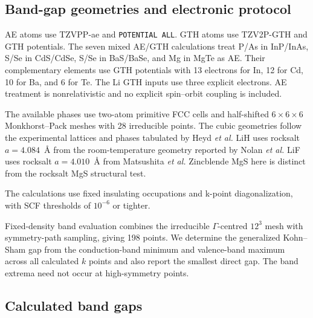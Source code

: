 \documentclass[10pt,a4paper]{article}
\begin{document}
\subsection{Band-gap geometries and electronic protocol}
\label{sec:bandgap-protocol}



AE atoms use TZVPP-ae and \texttt{POTENTIAL ALL}. GTH atoms use TZV2P-GTH and GTH potentials. The seven mixed AE/GTH calculations treat P/As in InP/InAs, S/Se in CdS/CdSe, S/Se in BaS/BaSe, and Mg in MgTe as AE. Their complementary elements use GTH potentials with 13 electrons for In, 12 for Cd, 10 for Ba, and 6 for Te. The Li GTH inputs use three explicit electrons. AE treatment is nonrelativistic and no explicit spin--orbit coupling is included.

The available phases use two-atom primitive FCC cells and half-shifted $6\times6\times6$ Monkhorst--Pack meshes\cite{Monkhorst1976} with 28 irreducible points. The cubic geometries follow the experimental lattices and phases tabulated by Heyd \emph{et al.}\cite{Heyd2005Gaps} LiH uses rocksalt $a=4.084$~\AA{} from the room-temperature geometry reported by Nolan \emph{et al.}\cite{Nolan2009LiH} LiF uses rocksalt $a=4.010$~\AA{} from Matsushita \emph{et al.}\cite{Matsushita2011Gaps}   Zincblende MgS here is distinct from the rocksalt MgS structural test.

The calculations use fixed insulating occupations and k-point diagonalization, with SCF thresholds of $10^{-6}$ or tighter.

Fixed-density band evaluation combines the irreducible $\Gamma$-centred $12^3$ mesh with symmetry-path sampling, giving 198 points. We determine the generalized Kohn--Sham gap from the conduction-band minimum and valence-band maximum across all calculated $k$ points and also report the smallest direct gap. The band extrema need not occur at high-symmetry points.


\subsection{Calculated band gaps}
\end{document}
